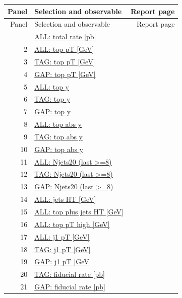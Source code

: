 \documentclass[11pt,a4paper]{article}
\begin{document}
\begin{longtable}{@{}rL{112mm}r@{}}
\toprule
Panel & Selection and observable & Report page\\
\midrule
\endfirsthead
\toprule
Panel & Selection and observable & Report page\\
\midrule
\endhead
\bottomrule
{} & \hyperref[atlas:p01]{ALL: total rate [pb]} & \pageref{atlas:p01}\\
2 & \hyperref[atlas:p02]{ALL: top pT [GeV]} & \pageref{atlas:p02}\\
3 & \hyperref[atlas:p03]{TAG: top pT [GeV]} & \pageref{atlas:p03}\\
4 & \hyperref[atlas:p04]{GAP: top pT [GeV]} & \pageref{atlas:p04}\\
5 & \hyperref[atlas:p05]{ALL: top y} & \pageref{atlas:p05}\\
6 & \hyperref[atlas:p06]{TAG: top y} & \pageref{atlas:p06}\\
7 & \hyperref[atlas:p07]{GAP: top y} & \pageref{atlas:p07}\\
8 & \hyperref[atlas:p08]{ALL: top abs y} & \pageref{atlas:p08}\\
9 & \hyperref[atlas:p09]{TAG: top abs y} & \pageref{atlas:p09}\\
10 & \hyperref[atlas:p10]{GAP: top abs y} & \pageref{atlas:p10}\\
11 & \hyperref[atlas:p11]{ALL: Njets20 (last >=8)} & \pageref{atlas:p11}\\
12 & \hyperref[atlas:p12]{TAG: Njets20 (last >=8)} & \pageref{atlas:p12}\\
13 & \hyperref[atlas:p13]{GAP: Njets20 (last >=8)} & \pageref{atlas:p13}\\
14 & \hyperref[atlas:p14]{ALL: jets HT [GeV]} & \pageref{atlas:p14}\\
15 & \hyperref[atlas:p15]{ALL: top plus jets HT [GeV]} & \pageref{atlas:p15}\\
16 & \hyperref[atlas:p16]{ALL: top pT high [GeV]} & \pageref{atlas:p16}\\
17 & \hyperref[atlas:p17]{ALL: j1 pT [GeV]} & \pageref{atlas:p17}\\
18 & \hyperref[atlas:p18]{TAG: j1 pT [GeV]} & \pageref{atlas:p18}\\
19 & \hyperref[atlas:p19]{GAP: j1 pT [GeV]} & \pageref{atlas:p19}\\
20 & \hyperref[atlas:p20]{TAG: fiducial rate [pb]} & \pageref{atlas:p20}\\
21 & \hyperref[atlas:p21]{GAP: fiducial rate [pb]} & \pageref{atlas:p21}\\

\end{longtable}
\end{document}
